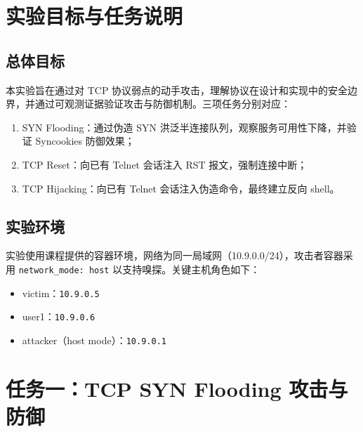 \documentclass[12pt,hyperref,a4paper,UTF8,fontset=none]{ctexart}
\newcommand{\term}[1]{\textbf{#1}}
\begin{document}
\cover

\begin{abstract}
本报告完整记录 TCP 三个攻击实验：\term{TCP SYN Flooding}、\term{TCP Reset}、\term{TCP Session Hijacking/Reverse Shell}。报告严格基于本人实测截图与实测代码，给出从环境搭建、攻击实施、防御验证、异常排障到原理分析的全流程证据链。实验重点包括：\textbf{半连接队列竞争与 Syncookies 防御机理}、\textbf{RST 序号窗口匹配机理}、\textbf{会话劫持中 seq/ack 与负载时序一致性}，并进一步扩展到\textbf{自动化注入的接口选择策略}与\textbf{反向 shell 建链机制}。

\textbf{关键词}: TCP, SYN Flooding, RST Injection, Session Hijacking, Reverse Shell, Scapy
\end{abstract}

\tableofcontents
\newpage

\section{实验目标与任务说明}
\subsection{总体目标}
本实验旨在通过对 TCP 协议弱点的动手攻击，理解协议在设计和实现中的安全边界，并通过可观测证据验证攻击与防御机制。三项任务分别对应：
\begin{enumerate}
    \item SYN Flooding：通过伪造 SYN 洪泛半连接队列，观察服务可用性下降，并验证 Syncookies 防御效果；
    \item TCP Reset：向已有 Telnet 会话注入 RST 报文，强制连接中断；
    \item TCP Hijacking：向已有 Telnet 会话注入伪造命令，最终建立反向 shell。
\end{enumerate}

\subsection{实验环境}
实验使用课程提供的容器环境，网络为同一局域网（10.9.0.0/24），攻击者容器采用 \texttt{network\_mode: host} 以支持嗅探。关键主机角色如下：
\begin{itemize}
    \item victim：\texttt{10.9.0.5}
    \item user1：\texttt{10.9.0.6}
    \item attacker（host mode）：\texttt{10.9.0.1}
\end{itemize}

\section{任务一：TCP SYN Flooding 攻击与防御}
\end{document}
